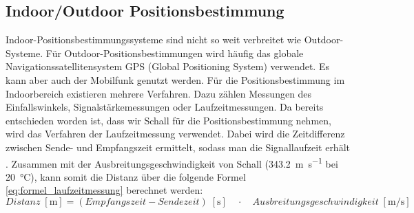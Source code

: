 \subsection{Indoor/Outdoor Positionsbestimmung}
Indoor-Positionsbestimmungssysteme sind nicht so weit verbreitet wie Outdoor-Systeme. Für Outdoor-Positionsbestimmungen wird häufig das globale Navigationssatellitensystem GPS (Global Positioning System) verwendet. Es kann aber auch der Mobilfunk genutzt werden. Für die Positionsbestimmung im Indoorbereich existieren mehrere Verfahren. Dazu zählen Messungen des Einfallswinkels, Signalstärkemessungen oder Laufzeitmessungen. Da bereits entschieden worden ist, dass wir Schall für die Positionsbestimmung nehmen, wird das Verfahren der Laufzeitmessung verwendet. Dabei wird die Zeitdifferenz zwischen Sende- und Empfangszeit ermittelt, sodass man die Signallaufzeit erhält \cite{src_INDOOR_OUTDOOR_SYSTEME}. Zusammen mit der Ausbreitungsgeschwindigkeit von Schall (\SI{343,2}{\metre\per\second} bei \SI{20}{\degreeCelsius}), kann somit die Distanz über die folgende Formel \ref{eq:formel_laufzeitmessung} berechnet werden:
\begin{equation}
	Distanz \;[\si{\metre}] = (Empfangszeit - Sendezeit)\;[\si{\second}]\quad \cdot \quad Ausbreitungsgeschwindigkeit \;[\si{\metre\per\second}]
   \label{eq:formel_laufzeitmessung}
\end{equation}

